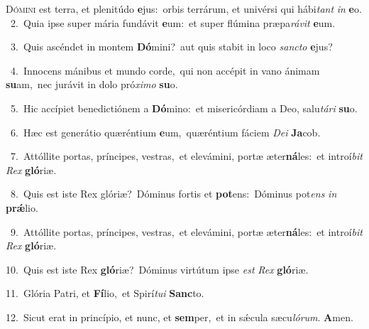 \lettrine{\initial\textcolor{\initialcolor}{D}}{ómini} est terra, et plenitúdo \textbf{e}\-jus:~\star orbis terrárum, et univérsi qui hábi\textit{tant} \textit{in} \textbf{e}\-o.\\
{\numbfont\textcolor{\numbcolor}{~2.}}~Quia ipse super mária fundávit \textbf{e}\-um:~\star et super flúmina præpa\-\textit{rá}\-\textit{vit} \textbf{e}\-um.\par
{\numbfont\textcolor{\numbcolor}{~3.}}~Quis ascéndet in montem \textbf{Dó}\-mini?~\star aut quis stabit in loco \textit{sanc}\-\textit{to} \textbf{e}\-jus?\par
{\numbfont\textcolor{\numbcolor}{~4.}}~Innocens mánibus et mundo corde,~\dagger qui non accépit in vano ánimam \textbf{su}\-am,~\star nec jurávit in dolo pró\-\textit{xi}\-\textit{mo} \textbf{su}\-o.\par
{\numbfont\textcolor{\numbcolor}{~5.}}~Hic accípiet benedictiónem a \textbf{Dó}\-mino:~\star et misericórdiam a Deo, salu\-\textit{tá}\-\textit{ri} \textbf{su}\-o.\par
{\numbfont\textcolor{\numbcolor}{~6.}}~Hæc est generátio quæréntium \textbf{e}\-um,~\star quæréntium fáciem \textit{De}\-\textit{i} \textbf{Ja}\-cob.\par
{\numbfont\textcolor{\numbcolor}{~7.}}~Attóllite portas, príncipes, vestras,~\dagger et elevámini, portæ æter\-\textbf{ná}\-les:~\star et introí\textit{bit} \textit{Rex} \textbf{gló}\-riæ.\par
{\numbfont\textcolor{\numbcolor}{~8.}}~Quis est iste Rex glóriæ?~\dagger Dóminus fortis et \textbf{pot}\-ens:~\star Dóminus pot\textit{ens} \textit{in} \textbf{prǽ}\-lio.\par
{\numbfont\textcolor{\numbcolor}{~9.}}~Attóllite portas, príncipes, vestras,~\dagger et elevámini, portæ æter\-\textbf{ná}\-les:~\star et introí\textit{bit} \textit{Rex} \textbf{gló}\-riæ.\par
{\numbfont\textcolor{\numbcolor}{10.}}~Quis est iste Rex \textbf{gló}\-riæ?~\star Dóminus virtútum ipse \textit{est} \textit{Rex} \textbf{gló}\-riæ.\par
{\numbfont\textcolor{\numbcolor}{11.}}~Glória Patri, et \textbf{Fí}\-lio,~\star et Spirí\-\textit{tu}\-\textit{i} \textbf{Sanc}\-to.\par
{\numbfont\textcolor{\numbcolor}{12.}}~Sicut erat in princípio, et nunc, et \textbf{sem}\-per,~\star et in sǽcula sæcu\-\textit{ló}\-\textit{rum}. \textbf{A}\-men.\par
